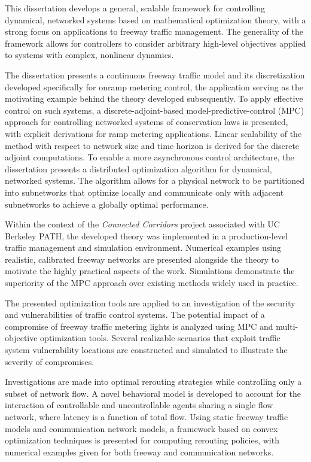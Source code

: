 This dissertation develops a general, scalable framework for controlling dynamical, networked systems based on mathematical optimization theory, with a strong focus on applications to freeway traffic management. The generality of the framework allows for controllers to consider arbitrary high-level objectives applied to systems with complex, nonlinear dynamics.

The dissertation presents a continuous freeway traffic model and its discretization developed specifically for onramp metering control, the application serving as the motivating example behind the theory developed subsequently. To apply effective control on such systems, a discrete-adjoint-based model-predictive-control (MPC) approach for controlling networked systems of conservation laws is presented, with explicit derivations for ramp metering applications. Linear scalability of the method with respect to network size and time horizon is derived for the discrete adjoint computations. To enable a more asynchronous control architecture, the dissertation presents a distributed optimization algorithm for dynamical, networked systems. The algorithm allows for a physical network to be partitioned into subnetworks that optimize locally and communicate only with adjacent subnetworks to achieve a globally optimal performance. 

Within the context of the \emph{Connected Corridors} project associated with UC Berkeley PATH, the developed theory was implemented in a production-level traffic management and simulation environment. Numerical examples using realistic, calibrated freeway networks are presented alongside the theory to motivate the highly practical aspects of the work. Simulations demonstrate the superiority of the MPC approach over existing methods widely used in practice.

The presented optimization tools are applied to an investigation of the security and vulnerabilities of traffic control systems. The potential impact of a compromise of freeway traffic metering lights is analyzed using MPC and multi-objective optimization tools. Several realizable scenarios that exploit traffic system vulnerability locations are constructed and simulated to illustrate the severity of compromises.

Investigations are made into optimal rerouting strategies while controlling only a subset of network flow. A novel behavioral model is developed to account for the interaction of controllable and uncontrollable agents sharing a single flow network, where latency is a function of total flow. Using static freeway traffic models and communication network models, a framework based on convex optimization techniques is presented for computing rerouting policies, with numerical examples given for both freeway and communication networks.